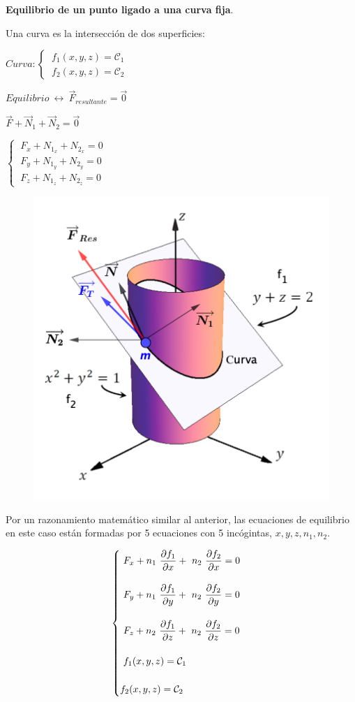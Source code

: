 \begin{ejem}
\textbf{Equilibrio de un punto ligado a una curva fija}.	
\end{ejem}
\begin{multicols}{2}
	
Una curva es la intersección de dos superficies:

$Curva: \begin{cases} \ f_1(x,y,z)=\mathcal C_1 \\ \ f_2(x,y,z)=\mathcal C_2 \end{cases}$

$Equilibrio \ \leftrightarrow \ \overrightarrow{F}_{resultante}=\vec 0$

$\overrightarrow{F}+\overrightarrow{N}_1 + \overrightarrow{N}_2=\vec 0$

$\begin{cases}\ F_x+N_{1_x}+N_{2_x}=0  \\  \ F_y+N_{1_y}+N_{2_y}=0 \\ \ F_z+N_{1_z}+N_{2_z}=0 \end{cases}$
 
\begin{figure}[H]
	\centering
	\includegraphics[width=.55\textwidth]{imagenes/imagenes05/T05IM05.png}
\end{figure}
\end{multicols}

Por un razonamiento matemático similar al anterior, las ecuaciones de equilibrio en este caso están formadas por 5 ecuaciones con 5 incógintas, $x,y,z,n_1,n_2$.

$$\displaystyle
\begin{cases}
\displaystyle \ F_x+n_1 \ \pdv{f_1}{x} + \ n_2\ \pdv{f_2}{x}=0 \\ \\ \displaystyle \ F_y+n_1\ \pdv{f_1}{y} + \ n_2\ \pdv{f_2}{y}=0  \\  \\ \displaystyle \ F_z+n_2\ \pdv{f_1}{z} + \ n_2\ \pdv{f_2}{z}=0  \\ \\ \ f_1(x,y,z)=\mathcal C_1 \\ \\f_2(x,y,z)=\mathcal C_2
\end{cases}$$

